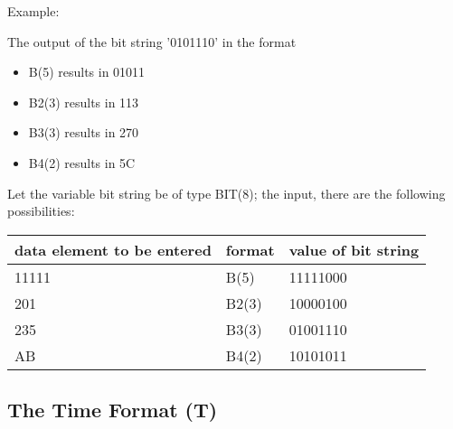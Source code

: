 Example:

The output of the bit string '0101110' in the format

\begin{itemize}
\item B(5) results in 01011 
\item B2(3) results in 113 
\item B3(3) results in 270 
\item B4(2) results in 5C
\end{itemize}

Let the variable bit string be of type BIT(8); the input, there are the
following possibilities:

\begin{tabular}{lll}
data element to be entered & format & value of bit string \\ \hline
11111                      & B(5)   &         11111000    \\
201                        & B2(3)  &         10000100    \\
235                        & B3(3)  &         01001110    \\
AB                         & B4(2)  &         10101011
\end{tabular}

\subsection{The Time Format (T)}   %
\label{sec_dation_t_format}



